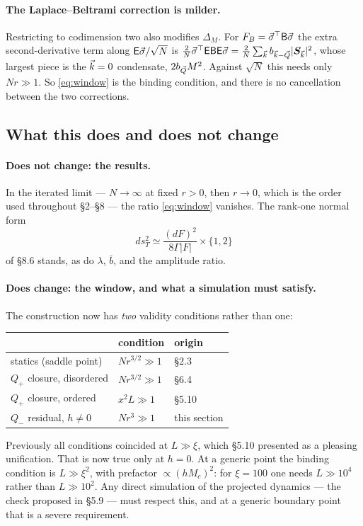 \paragraph{The Laplace--Beltrami correction is milder.} Restricting to codimension two also
modifies $\Delta_M$. For $F_B=\vec\sigma^\top\mathsf B\vec\sigma$ the extra second-derivative term along
$\mathsf{E}\vec\sigma/\sqrt N$ is $\tfrac2N\vec\sigma^\top\mathsf{E}\mathsf B\mathsf{E}\vec\sigma=\tfrac2N\sum_{\vec k}b_{\vec k-\vec Q}|\bm S_{\vec k}|^{2}$,
whose largest piece is the $\vec k=0$ condensate, $2b_{\vec Q}M^{2}$. Against $\sqrt N$ this needs
only $Nr\gg1$. So \eqref{eq:window} is the binding condition, and there is no cancellation
between the two corrections.

\subsection{What this does and does not change}
\paragraph{Does not change: the results.} In the iterated limit --- $N\to\infty$ at fixed
$r>0$, then $r\to0$, which is the order used throughout \S2--\S8 --- the ratio
\eqref{eq:window} vanishes. The rank-one normal form
\begin{equation}
  ds_T^{2}\simeq\frac{(dF)^{2}}{8\Gamma|F|}\times\{1,2\}
\end{equation}
of \S8.6 stands, as do $\lambda$, $\bar b$, and the amplitude ratio.

\paragraph{Does change: the window, and what a simulation must satisfy.} The construction
now has \emph{two} validity conditions rather than one:
\begin{center}
\begin{tabular}{lll}
\hline
 & condition & origin\\
\hline
statics (saddle point) & $Nr^{3/2}\gg1$ & \S2.3\\
$Q_+$ closure, disordered & $Nr^{3/2}\gg1$ & \S6.4\\
$Q_+$ closure, ordered & $x^{2}L\gg1$ & \S5.10\\
\rowcolor{gray!12}
$Q_-$ residual, $h\neq0$ & $Nr^{3}\gg1$ & this section\\
\hline
\end{tabular}
\end{center}
Previously all conditions coincided at $L\gg\xi$, which \S5.10 presented as a pleasing
unification. That is now true only at $h=0$. At a generic point the binding condition is
$L\gg\xi^{2}$, with prefactor $\propto(hM_c)^{2}$: for $\xi=100$ one needs $L\gg10^{4}$
rather than $L\gg10^{2}$. Any direct simulation of the projected dynamics --- the check
proposed in \S5.9 --- must respect this, and at a generic boundary point that is a severe
requirement.

